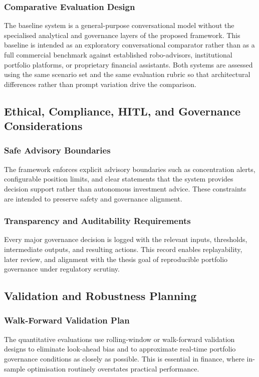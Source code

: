 \documentclass[11pt]{article}
\begin{document}
\subsubsection{Comparative Evaluation Design}
The baseline system is a general-purpose conversational model without the specialised analytical and governance layers of the proposed framework. This baseline is intended as an exploratory conversational comparator rather than as a full commercial benchmark against established robo-advisors, institutional portfolio platforms, or proprietary financial assistants. Both systems are assessed using the same scenario set and the same evaluation rubric so that architectural differences rather than prompt variation drive the comparison.

\subsection{Ethical, Compliance, HITL, and Governance Considerations}
\subsubsection{Safe Advisory Boundaries}
The framework enforces explicit advisory boundaries such as concentration alerts, configurable position limits, and clear statements that the system provides decision support rather than autonomous investment advice. These constraints are intended to preserve safety and governance alignment.

\subsubsection{Transparency and Auditability Requirements}
Every major governance decision is logged with the relevant inputs, thresholds, intermediate outputs, and resulting actions. This record enables replayability, later review, and alignment with the thesis goal of reproducible portfolio governance under regulatory scrutiny.

\subsection{Validation and Robustness Planning}
\subsubsection{Walk-Forward Validation Plan}
The quantitative evaluations use rolling-window or walk-forward validation designs to eliminate look-ahead bias and to approximate real-time portfolio governance conditions as closely as possible. This is essential in finance, where in-sample optimisation routinely overstates practical performance.
\end{document}
